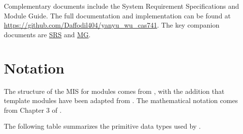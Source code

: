 \documentclass[12pt, titlepage]{article}
\begin{document}
Complementary documents include the System Requirement Specifications
and Module Guide.  The full documentation and implementation can be
found at \url{https://github.com/Daffodil404/yanyu_wu_cas741}. The key
companion documents are
\href{https://daffodil404.github.io/yanyu_wu_cas741/SRS/SRS.pdf}{SRS}
and
\href{https://daffodil404.github.io/yanyu_wu_cas741/Design/SoftArchitecture/MG.pdf}{MG}.

\section{Notation}


The structure of the MIS for modules comes from \citet{HoffmanAndStrooper1995},
with the addition that template modules have been adapted from
\cite{GhezziEtAl2003}.  The mathematical notation comes from Chapter 3 of
\citet{HoffmanAndStrooper1995}. 

The following table summarizes the primitive data types used by \progname. 
\end{document}
